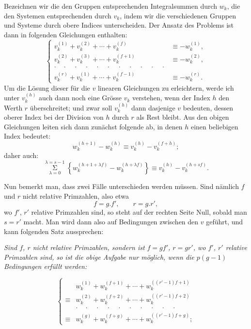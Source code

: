\documentclass{article}
\begin{document}
Bezeichnen wir die den Gruppen entsprechenden Integralsummen durch $w_{k}$, die den Systemen entsprechenden durch $v_{k}$, indem wir die verschiedenen Gruppen und Systeme durch obere Indices unterscheiden. Der Ansatz des Problems ist dann in folgenden Gleichungen enthalten:
\[ \left\{ \begin{aligned}
v_{k}^{(1)}+v_{k}^{(2)}+\cdots+v_{k}^{(f)} &\equiv -w_{k}^{(1)}, \\
v_{k}^{(2)}+v_{k}^{(3)}+\cdots+v_{k}^{(f+1)} &\equiv -w_{k}^{(2)}, \\
\cdot\quad\cdot\quad\cdot\quad\cdot\quad\cdot\quad\cdot\quad\cdot\quad\cdot\quad\cdot\quad\cdot\quad\cdot & \\
v_{k}^{(r)}+v_{k}^{(1)}+\cdots+v_{k}^{(f-1)} &\equiv -w_{k}^{(r)}.
\end{aligned} \right. \tag{1.} \]
Um die Lösung dieser für die $v$ linearen Gleichungen zu erleichtern, werde ich unter $v_{k}^{(h)}$ auch dann noch eine Grösse $v_{k}$ verstehen, wenn der Index $h$ den Werth $r$ überschreitet; und zwar soll $v_{k}^{(h)}$ dann dasjenige $v$ bedeuten, dessen oberer Index bei der Division von $h$ durch $r$ als Rest bleibt. Aus den obigen Gleichungen leiten sich dann zunächst folgende ab, in denen $h$ einen beliebigen Index bedeutet:
\[ w_{k}^{(h+1)}-w_{k}^{(h)} \equiv v_{k}^{(h)}-v_{k}^{(f+h)}; \]
daher auch:
\[ \mathop{\Sigma}\limits_{\lambda=0}^{\lambda=s-1} \left\{ w_{k}^{(h+1+\lambda f)}-w_{k}^{(h+\lambda f)} \right\} \equiv v_{k}^{(h)}-v_{k}^{(h+sf)}. \tag{2.} \]

Nun bemerkt man, dass zwei Fälle unterschieden werden müssen. Sind nämlich $f$ und $r$ nicht relative Primzahlen, also etwa
\[ f=g.f', \qquad r=g.r', \]
wo $f'$, $r'$ relative Primzahlen sind, so steht auf der rechten Seite Null, sobald man $s=r'$ macht. Man wird dann also auf Bedingungen zwischen den $v$ geführt, und kann folgenden Satz aussprechen:

\emph{Sind $f$, $r$ nicht relative Primzahlen, sondern ist $f=gf'$, $r=gr'$, wo $f'$, $r'$ relative Primzahlen sind, so ist die obige Aufgabe nur möglich, wenn die $p(g-1)$ Bedingungen erfüllt werden:}

\[ \left\{ \begin{aligned}
& w_{k}^{(1)}+w_{k}^{(f+1)}+\cdots+w_{k}^{((r'-1)f+1)} \\
\equiv{} & w_{k}^{(2)}+w_{k}^{(f+2)}+\cdots+w_{k}^{((r'-1)f+2)} \\
& \cdot\quad\cdot\quad\cdot\quad\cdot\quad\cdot\quad\cdot\quad\cdot\quad\cdot\quad\cdot\quad\cdot \\
\equiv{} & w_{k}^{(g)}+w_{k}^{(f+g)}+\cdots+w_{k}^{((r'-1)f+g)};
\end{aligned} \right. \tag{3.} \]
\end{document}
